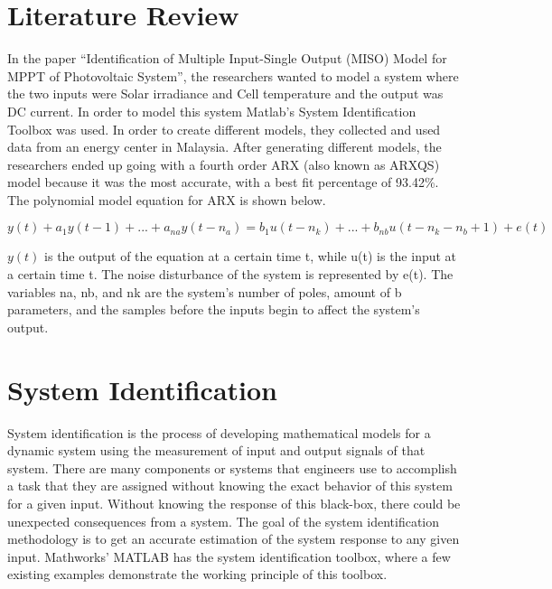 \documentclass[letterpaper,12pt]{article}   %
\begin{document}
 \section{Literature Review}
In the paper “Identification of Multiple Input-Single Output (MISO) Model for MPPT of Photovoltaic System”, the researchers wanted to model a system where the two inputs were Solar irradiance and Cell temperature and the output was DC current. In order to model this system Matlab’s System Identification Toolbox was used. In order to create different models, they collected and used data from an energy center in Malaysia. After generating different models, the researchers ended up going with a fourth order ARX (also known as ARXQS) model because it was the most accurate, with a best fit percentage of 93.42\%. The polynomial model equation for ARX is shown below. 

$y(t) + a_1y(t - 1) +...+a_{na}y(t - n_{a}) = b_{1}u(t-n_{k})+...+b_{nb}u(t - n_{k}-n_{b}+1) + e(t)$

$y(t)$ is the output of the equation at a certain time t, while u(t) is the input at a certain time t. The noise disturbance of the system is represented by e(t). The variables na, nb, and nk are the system’s number of poles, amount of b parameters, and the samples before the inputs begin to affect the system’s output.



\section{System Identification}

System identification is the process of developing mathematical models for a dynamic system using the measurement of input and output signals of that system. There are many components or systems that engineers use to accomplish a task that they are assigned without knowing the exact behavior of this system for a given input. Without knowing the response of this black-box, there could be unexpected consequences from a system. The goal of the system identification methodology is to get an accurate estimation of the system response to any given input. Mathworks' MATLAB has the system identification toolbox, where a few existing examples demonstrate the working principle of this toolbox.
\end{document}
